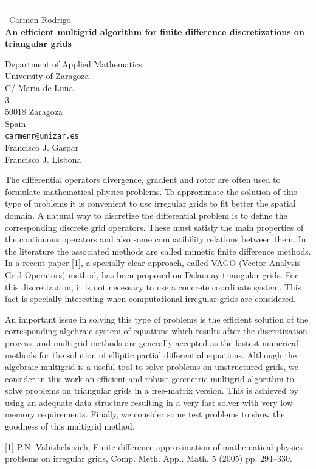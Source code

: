 \documentclass{report}
\begin{document}
\begin{center}
\rule{6in}{1pt} \
{\large Carmen Rodrigo \\
{\bf An efficient multigrid algorithm for finite difference discretizations on triangular grids}}

Department of Applied Mathematics \\ University of Zaragoza \\ C/ Maria de Luna \\ 3 \\ 50018 Zaragoza \\ Spain
\\
{\tt carmenr@unizar.es}\\
Francisco J. Gaspar\\
Francisco J.  Lisbona\end{center}

The differential operators divergence, gradient and rotor are often used
to formulate mathematical physics problems. To approximate the solution
of this type of problems it is convenient to use irregular grids to fit
better the spatial domain. A natural way to discretize the differential
problem is to define the corresponding discrete grid operators. These
must satisfy the main properties of the continuous operators and also
some compatibility
relations between them. In the literature the associated methods are
called mimetic finite difference methods. In a recent paper [1], a
specially clear approach, called VAGO (Vector Analysis Grid Operators)
method, has been proposed on Delaunay triangular grids. For this
discretization, it is not necessary to use a concrete coordinate system.
This fact is specially interesting when computational irregular grids are
considered.

An important issue in solving this type of problems is the efficient
solution of the corresponding algebraic system of equations which results
after the discretization process, and multigrid methods are generally
accepted as the fastest numerical methods for the solution of elliptic
partial differential equations. Although the algebraic multigrid is a
useful tool to solve problems on unstructured grids, we consider in this
work an efficient and robust geometric multigrid algorithm to solve
problems on triangular grids in a free-matrix version. This is achieved
by using an adequate data structure resulting in a very fast solver with
very low memory requirements. Finally, we consider some test problems to
show the goodness of this multigrid method.

[1] P.N. Vabishchevich, Finite difference approximation of mathematical
physics problems on irregular grids,
Comp. Meth. Appl. Math. 5 (2005) pp. 294--330.
\end{document}
